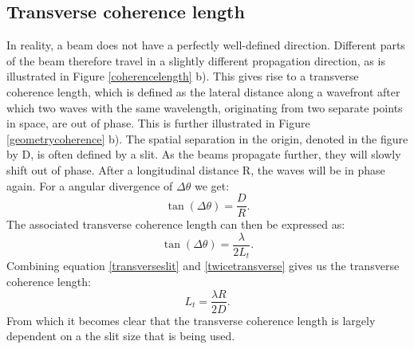\subsection{Transverse coherence length}
In reality, a beam does not have a perfectly well-defined direction. Different parts of the beam therefore travel in a slightly different propagation direction, as is illustrated in Figure \ref{coherencelength} b). This gives rise to a transverse coherence length, which is defined as the lateral distance along a wavefront after which two waves with the same wavelength, originating from two separate points in space, are out of phase.  This is further illustrated in Figure \ref{geometrycoherence} b). The spatial separation in the origin, denoted in the figure by D, is often defined by a slit. As the beams propagate further, they will slowly shift out of phase. After a longitudinal distance R, the waves will be in phase again. For a angular divergence of $\Delta \theta$ we get:
\begin{equation}\label{transverseslit}
	\tan(\Delta \theta) = \frac{D}{R}.
\end{equation}
The associated transverse coherence length can then be expressed as:
\begin{equation}\label{twicetransverse}
	\tan(\Delta \theta)  = \frac{\lambda}{2L_t} .
\end{equation} 
Combining equation \ref{transverseslit} and \ref{twicetransverse}
gives us the transverse coherence length:
\begin{equation}
	L_t = \frac{\lambda R}{2D}.
\end{equation}
From which it becomes clear that the transverse coherence length is largely dependent on a the slit size that is being used. 

